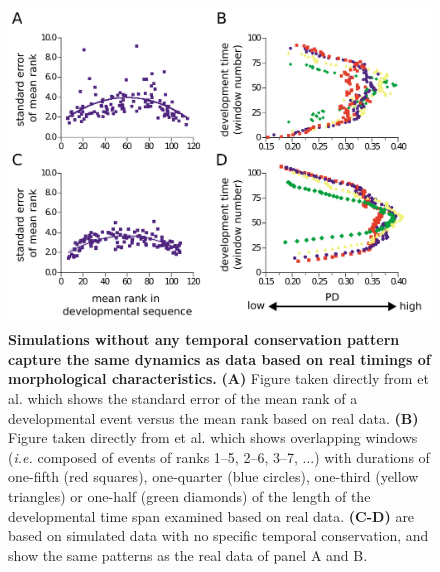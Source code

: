 \begin{figure}
    \includegraphics[width=\linewidth]{ch.inverthourglass/imgs/inverting.png}
    \caption{\textbf{Simulations without any temporal conservation pattern capture the same dynamics as data based on real timings of morphological characteristics.} \textbf{(A)} Figure taken directly from et al.\cite{OlafRP2003} which shows the standard error of the mean rank of a developmental event versus the mean rank based on real data. \textbf{(B)} Figure taken directly from et al.\cite{OlafRP2003} which shows overlapping windows (\textit{i.e.} composed of events of ranks 1–5, 2–6, 3–7, ...) with durations of one-fifth (red squares), one-quarter (blue circles), one-third (yellow triangles) or one-half (green diamonds) of the length of the developmental time span examined based on real data. \textbf{(C-D)} are based on simulated data with no specific temporal conservation, and show the same patterns as the real data of panel A and B. }
    \label{fig:inverting_inversehourglass}
\end{figure}

